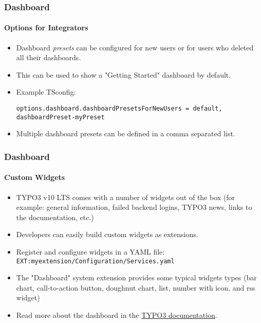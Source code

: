 
\begin{frame}[fragile]
	\frametitle{Dashboard}
	\framesubtitle{Options for Integrators}

	\lstset{basicstyle=\tiny\ttfamily}

	\begin{itemize}
		\item Dashboard \textit{presets} can be configured for new users or for users who deleted all their dashboards.
		\item This can be used to show a "Getting Started" dashboard by default.
		\item Example TSconfig:

\vspace{-0.4cm}
\begin{lstlisting}
options.dashboard.dashboardPresetsForNewUsers = default, dashboardPreset-myPreset
\end{lstlisting}

		\item Multiple dashboard presets can be defined in a comma separated list.
	\end{itemize}

\end{frame}


\begin{frame}[fragile]
	\frametitle{Dashboard}
	\framesubtitle{Custom Widgets}

	\begin{itemize}
		\item TYPO3 v10 LTS comes with a number of widgets out of the box\newline
			\smaller
				(for example: general information, failed backend logins, TYPO3 news, links to the documentation, etc.)
			\normalsize
		\item Developers can easily build custom widgets as extensions.
		\item Register and configure widgets in a YAML file:\newline
			\small
				\texttt{EXT:myextension/Configuration/Services.yaml}
			\normalsize
		\item The "Dashboard" system extension provides some typical widgets types\newline
			\smaller
				(bar chart, call-to-action button, doughnut chart, list, number with icon, and rss widget)
			\normalsize
		\item Read more about the dashboard in the
			\href{https://docs.typo3.org/c/typo3/cms-dashboard/master/en-us/}{TYPO3 documentation}.

	\end{itemize}

\end{frame}

